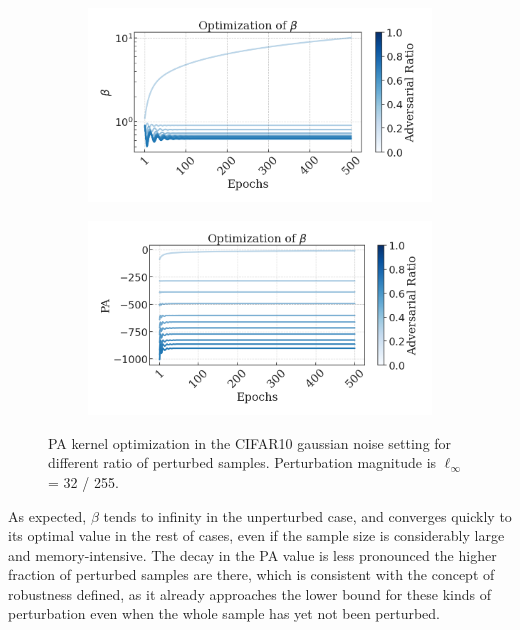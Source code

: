 \begin{figure}[H]
    \centering
    \begin{subfigure}[b]{0.49\textwidth}
        \centering
        \includegraphics[width=\textwidth]{img/results_discussion/empirical/betas.png}
    \end{subfigure}
    \hfill
    \begin{subfigure}[b]{0.49\textwidth}
        \centering
        \includegraphics[width=\textwidth]{img/results_discussion/empirical/logpas.png}
    \end{subfigure}
    \caption{PA kernel optimization in the CIFAR10 gaussian noise setting for different ratio
    of perturbed samples. Perturbation magnitude is $\ell_\infty$ = 32 / 255.}
    \label{fig:gaussian_optimization}
\end{figure}

As expected, $\beta$ tends to infinity in the unperturbed case, and converges
quickly to its optimal value in the rest of cases, even if the sample size is considerably
large and memory-intensive. The decay in the PA value is less pronounced the higher
fraction of perturbed samples are there, which is consistent with the concept 
of robustness defined, as it already approaches
the lower bound for these kinds of perturbation even when the whole sample has yet not
been perturbed. \\

